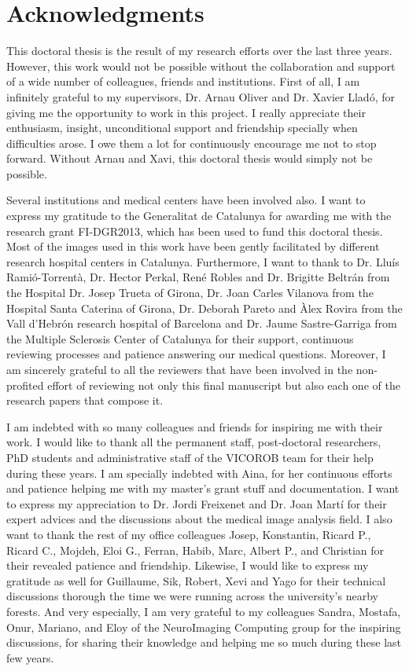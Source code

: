 
\chapter*{Acknowledgments}


This doctoral thesis is the result of my research efforts over the last three years.  However, this work would not be possible without the collaboration and support of a wide number of colleagues, friends and institutions. First of all, I am infinitely grateful to my supervisors, Dr. Arnau Oliver and Dr. Xavier Lladó, for giving me the opportunity to work in this project. I really appreciate their enthusiasm, insight, unconditional support and friendship specially when difficulties arose. I owe them a lot for continuously encourage me not to stop forward. Without Arnau and Xavi, this doctoral thesis would simply not be possible.   

Several institutions and medical centers have been involved also.  I want to express my gratitude to the Generalitat de Catalunya for awarding me with the research grant FI-DGR2013, which has been used to fund this doctoral thesis. Most of the images used in this work have been gently facilitated by different research hospital centers in Catalunya. Furthermore, I want to thank to Dr. Lluís Ramió-Torrentà, Dr. Hector Perkal,  René Robles and Dr. Brigitte Beltrán from the Hospital Dr. Josep Trueta of Girona, Dr. Joan Carles Vilanova from the Hospital Santa Caterina of Girona, Dr. Deborah Pareto and Àlex Rovira from the Vall d’Hebrón research hospital of Barcelona and Dr. Jaume Sastre-Garriga from the Multiple Sclerosis Center of Catalunya for their support, continuous reviewing processes and patience answering our medical questions.  Moreover, I am sincerely grateful to all the reviewers that have been involved in the non-profited effort of reviewing not only this final manuscript but also each one of the research papers that compose it.

I am indebted with so many colleagues and friends for inspiring me with their work.  I would like to thank all the permanent staff, post-doctoral researchers, PhD students and administrative staff of the VICOROB team for their help during these years.  I am specially indebted with Aina, for her continuous efforts and patience helping me with my master’s grant stuff and documentation.  I want to express my appreciation to Dr. Jordi Freixenet and Dr. Joan Martí for their expert advices and the discussions about the medical image analysis field. I also want to thank the rest of my office colleagues Josep, Konstantin, Ricard P., Ricard C., Mojdeh, Eloi G., Ferran, Habib, Marc, Albert P., and Christian for their revealed patience and friendship.  Likewise, I would like to express my gratitude as well for Guillaume, Sik, Robert, Xevi and Yago for their technical discussions thorough the time we were running across the university's nearby forests. And very especially, I am very grateful to my colleagues Sandra, Mostafa, Onur, Mariano, and Eloy of the NeuroImaging Computing group for the inspiring discussions, for sharing their knowledge and helping me so much during these last few years.    

